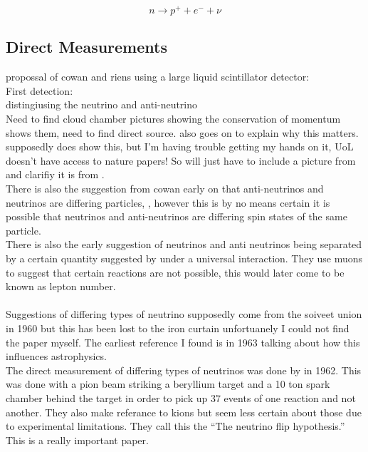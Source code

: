 \documentclass[12pt,a4paper]{article}
\begin{document}
\begin{equation}
    n \rightarrow p^+ + e^- + \nu
    \label{semi_modern_beta_decay}
\end{equation}

\subsection{Direct Measurements}
propossal of cowan and riens using a large liquid scintillator detector: \cite{reines1953proposed}
\\First detection: \cite{reines1953detection}
\\distingiusing the neutrino and anti-neutrino \cite{davis1959attempt}
\\Need to find cloud chamber pictures showing the conservation of momentum \cite{griffiths2008introduction} shows them, need to find direct source. \cite{griffiths2008introduction} also goes on to explain why this matters.
\\ \cite{michel1949energy} supposedly does show this, but I'm having trouble getting my hands on it, UoL doesn't have access to nature papers! So will just have to include a picture from \cite{griffiths2008introduction} and clarifiy it is from \cite{michel1949energy}.
\\ There is also the suggestion from cowan early on that anti-neutrinos and neutrinos are differing particles,  \cite{cowan1957test}, however this is by no means certain it is possible that neutrinos and anti-neutrinos are differing spin states of the same particle.
\\ There is also the early suggestion of neutrinos and anti neutrinos being separated by a certain quantity suggested by \cite{konopinski1953universal} under a universal interaction. They use muons to suggest that certain reactions are not possible, this would later come to be known as lepton number. \\\\

Suggestions of differing types of neutrino supposedly come from the soiveet union in 1960 but this has been lost to the iron curtain unfortuanely I could not find the paper myself. The earliest reference I found is \cite{pontecorvo1963neutrino} in 1963 talking about how this influences astrophysics. 
\\The direct measurement of differing types of neutrinos was done by \cite{DanbyG1962PhysRevLett.9.36} in 1962. This was done with a pion beam striking a beryllium target and a 10 ton spark chamber behind the target in order to pick up 37 events of one reaction and not another. They also make referance to kions but seem less certain about those due to experimental limitations. They call this the ``The neutrino flip hypothesis.'' This is a really important paper.
\end{document}
